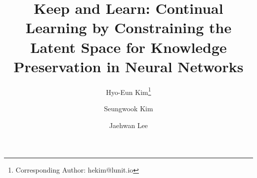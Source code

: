\documentclass[runningheads,a4paper]{llncs}
\begin{document}
\mainmatter  %

\title{Keep and Learn: Continual Learning by Constraining the Latent Space for Knowledge Preservation in Neural Networks}

%
%
\author{Hyo-Eun Kim\thanks{Corresponding Author: hekim@lunit.io}\and Seungwook Kim\and Jaehwan Lee}


%
%


\maketitle

%
\end{document}
